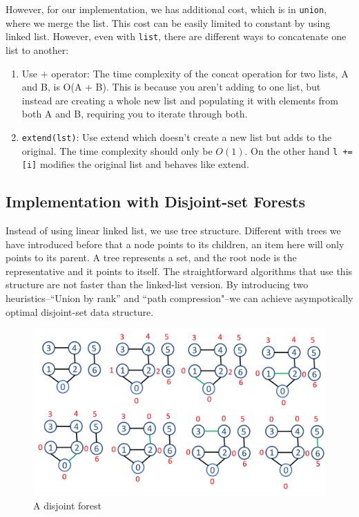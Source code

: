 \documentclass[../main.tex]{subfiles}
\begin{document}
However, for our implementation, we has additional cost, which is in \texttt{union}, where we merge the list. This cost can be easily limited to constant by using linked list. However, even with \texttt{list}, there are different ways to concatenate one list to another:

\begin{enumerate}
\item Use $+$ operator: The time complexity of the concat operation for two lists, A and B, is O(A + B). This is because you aren't adding to one list, but instead are creating a whole new list and populating it with elements from both A and B, requiring you to iterate through both.

\item \texttt{extend(lst)}: Use extend which doesn't create a new list but adds to the original. The time complexity should only be $O(1)$. On the other hand \texttt{l += [i]} modifies the original list and behaves like extend.
\end{enumerate}

\subsection{Implementation with Disjoint-set Forests}
Instead of using linear linked list, we use tree structure. Different with trees we have introduced before that a node points to its children, an item here will only points to its parent. A tree represents a set, and the root node is the representative and it points to itself. The straightforward algorithms that use this structure are not faster than the linked-list version. By introducing two heuristics--``Union by rank'' and ``path compression"--we can achieve asympotically optimal disjoint-set data structure.
\begin{figure}[h]
    \centering
    \includegraphics[width=0.98\columnwidth] {fig/disjoint_set.png}
    \caption{A disjoint forest}
    \label{fig:disjoint_forest_1}
\end{figure}
\end{document}
